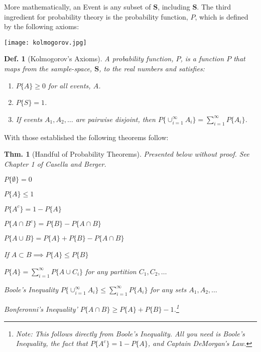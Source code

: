 \documentclass{tufte-book}
\theoremstyle{mytheoremstyle}
\newtheorem*{thm}{Thm.}
\theoremstyle{mylemstyle}
\theoremstyle{mydefstyle}
\newtheorem*{mydef}{Def.}
\begin{document}
More mathematically, an Event is any subset of \(\mathbf{S}\), including \(\mathbf{S}\). The third ingredient for probability theory is the probability function, \(P\), which is defined by the following axioms:
		\begin{marginfigure}
			\texttt{[image: kolmogorov.jpg]}
			\caption{Andrey Nikolaevich Kolmogorov. Respect.}
		\end{marginfigure}
\begin{mydef}[Kolmogorov's Axioms]
	A probability function, \(P\), is a function \(P\) that maps from the sample-space, \(\mathbf{S}\), to the real numbers and satisfies:
		\begin{enumerate}
			\item \(P\{A\} \ge 0\) for all events, \(A\).
			\item \(P\{S\} = 1\).
			\item If events \(A_1, A_2, \dots\) are pairwise disjoint, then \(P\{\cup^{\infty}_{i = 1} A_i\} = \sum_{i = 1}^\infty P\{A_i\}\).
		\end{enumerate}
\end{mydef}
With those established the following theorems follow:
\begin{thm}[Handful of Probability Theorems]
	Presented below without proof. See Chapter 1 of Casella and Berger.
	\begin{description}
		\item \(P\{\emptyset\} = 0\)
		\item \(P\{A\} \le 1\)
		\item \(P\{A^c\} = 1 - P\{A\}\)
		\item \(P\{A \cap B^c\} = P\{B\} - P\{A \cap B\}\)
		\item \(P\{A \cup B\} = P\{A\} + P\{B\} - P\{A \cap B\} \)
		\item If \(A \subset B \implies P\{A\} \le P\{B\}\)
		\item \(P\{A\} = \sum_{i = 1}^\infty P\{A \cup C_i\}\) for any partition \(C_1, C_2, \dots\)
		\item \emph{Boole's Inequality} \(P\{\cup_{i = 1}^\infty A_i\} \le \sum_{i = 1}^\infty P\{A_i\}\) for any sets \(A_1, A_2, \dots\)
		\item \emph{Bonferonni's Inequality'} \(P\{A \cap B\} \ge P\{A\} + P\{B\} - 1\).\footnote{Note: This follows directly from Boole's Inequality. All you need is Boole's Inequality, the fact that \(P\{A^c\} = 1 - P\{A\}\), and Captain DeMorgan's Law.}
	\end{description}
\end{thm}
\end{document}
